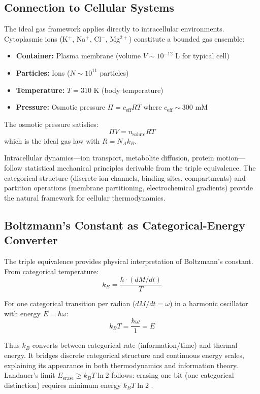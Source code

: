\subsection{Connection to Cellular Systems}

The ideal gas framework applies directly to intracellular environments. Cytoplasmic ions (K$^+$, Na$^+$, Cl$^-$, Mg$^{2+}$) constitute a bounded gas ensemble:
\begin{itemize}
\item \textbf{Container:} Plasma membrane (volume $V \sim 10^{-12}$ L for typical cell)
\item \textbf{Particles:} Ions ($N \sim 10^{11}$ particles)
\item \textbf{Temperature:} $T = 310$ K (body temperature)
\item \textbf{Pressure:} Osmotic pressure $\Pi = c_{\text{eff}}RT$ where $c_{\text{eff}} \sim 300$ mM
\end{itemize}

The osmotic pressure satisfies:
\begin{equation}
\Pi V = n_{\text{solute}} R T
\end{equation}
which is the ideal gas law with $R = N_A k_B$.

Intracellular dynamics---ion transport, metabolite diffusion, protein motion---follow statistical mechanical principles derivable from the triple equivalence. The categorical structure (discrete ion channels, binding sites, compartments) and partition operations (membrane partitioning, electrochemical gradients) provide the natural framework for cellular thermodynamics.

\subsection{Boltzmann's Constant as Categorical-Energy Converter}

The triple equivalence provides physical interpretation of Boltzmann's constant. From categorical temperature:
\begin{equation}
k_B = \frac{\hbar \cdot (dM/dt)}{T}
\end{equation}

For one categorical transition per radian ($dM/dt = \omega$) in a harmonic oscillator with energy $E = \hbar\omega$:
\begin{equation}
k_B T = \frac{\hbar\omega}{1} = E
\end{equation}

Thus $k_B$ converts between categorical rate (information/time) and thermal energy. It bridges discrete categorical structure and continuous energy scales, explaining its appearance in both thermodynamics and information theory. Landauer's limit $E_{\text{erase}} \geq k_BT\ln 2$ follows: erasing one bit (one categorical distinction) requires minimum energy $k_BT\ln 2$ \citep{landauer1961irreversibility}.

